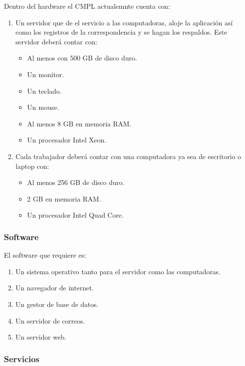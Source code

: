 Dentro del hardware el CMPL actualemnte cuenta con:
\begin{enumerate}
	\item Un servidor que de el servicio a las computadoras, aloje la aplicación así como los registros de la correspondencia y se hagan los respaldos. Este servidor deberá contar con: 
	\begin{itemize}
		\item Al menos con 500 GB de disco duro.
		\item Un monitor.
		\item Un teclado.
		\item Un mouse.
		\item Al menos 8 GB en memoria RAM.
		\item Un procesador Intel Xeon.
	\end{itemize}
	\item Cada trabajador deberá contar con una computadora ya sea de escritorio o laptop con: 
	\begin{itemize}
		\item Al menos 256 GB de disco duro.
		\item 2 GB en memoria RAM.
		\item Un procesador Intel Quad Core. 
	\end{itemize}
\end{enumerate}

\subsubsection{Software}
El software que requiere es: 
\begin{enumerate}
	\item Un sistema operativo tanto para el servidor como las computadoras.
	\item Un navegador de internet.
	\item Un gestor de base de datos.
	\item Un servidor de correos.
	\item Un servidor web.
\end{enumerate}
\subsubsection{Servicios}

